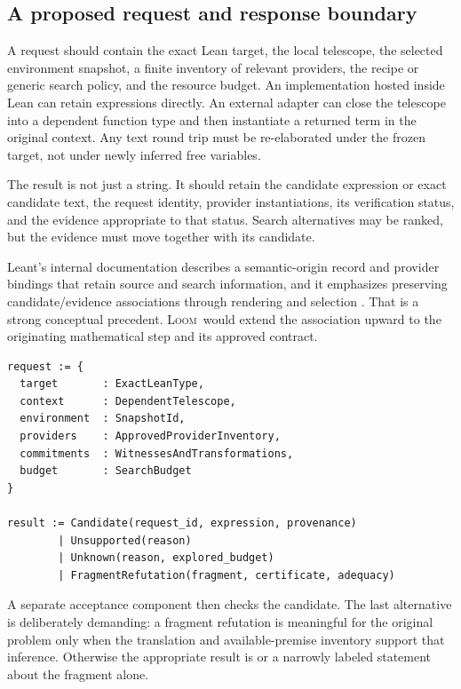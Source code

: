 \documentclass[11pt,letterpaper]{article}
\newcommand{\Loom}{\textsc{Loom}}
\newcommand{\code}[1]{\texttt{\detokenize{#1}}}
\theoremstyle{remark}
\begin{document}
\subsection{A proposed request and response boundary}

A request should contain the exact Lean target, the local telescope, the selected environment snapshot, a finite inventory of relevant providers, the recipe or generic search policy, and the resource budget. An implementation hosted inside Lean can retain expressions directly. An external adapter can close the telescope into a dependent function type and then instantiate a returned term in the original context. Any text round trip must be re-elaborated under the frozen target, not under newly inferred free variables.

The result is not just a string. It should retain the candidate expression or exact candidate text, the request identity, provider instantiations, its verification status, and the evidence appropriate to that status. Search alternatives may be ranked, but the evidence must move together with its candidate.

Leant's internal documentation describes a semantic-origin record and provider bindings that retain source and search information, and it emphasizes preserving candidate/evidence associations through rendering and selection \cite{leant-internals}. That is a strong conceptual precedent. \Loom\ would extend the association upward to the originating mathematical step and its approved contract.

\par\noindent\begin{minipage}{\linewidth}
\begin{lstlisting}[caption={Proposed adapter interface; not an existing Leant API.}]
request := {
  target       : ExactLeanType,
  context      : DependentTelescope,
  environment  : SnapshotId,
  providers    : ApprovedProviderInventory,
  commitments  : WitnessesAndTransformations,
  budget       : SearchBudget
}

result := Candidate(request_id, expression, provenance)
        | Unsupported(reason)
        | Unknown(reason, explored_budget)
        | FragmentRefutation(fragment, certificate, adequacy)
\end{lstlisting}
\end{minipage}\par
A separate acceptance component then checks the candidate. The last alternative is deliberately demanding: a fragment refutation is meaningful for the original problem only when the translation and available-premise inventory support that inference. Otherwise the appropriate result is \code{Unknown} or a narrowly labeled statement about the fragment alone.
\end{document}
